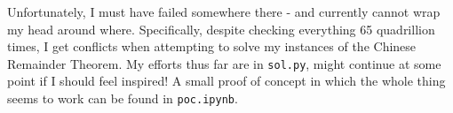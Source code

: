 \documentclass{article}
\begin{document}
Unfortunately, I must have failed somewhere there - and currently cannot wrap my head around where. Specifically, despite checking everything 65 quadrillion times, I get conflicts when attempting to solve my instances of the Chinese Remainder Theorem. My efforts thus far are in \texttt{sol.py}, might continue at some point if I should feel inspired! A small proof of concept in which the whole thing seems to work can be found in \texttt{poc.ipynb}.
\end{document}

